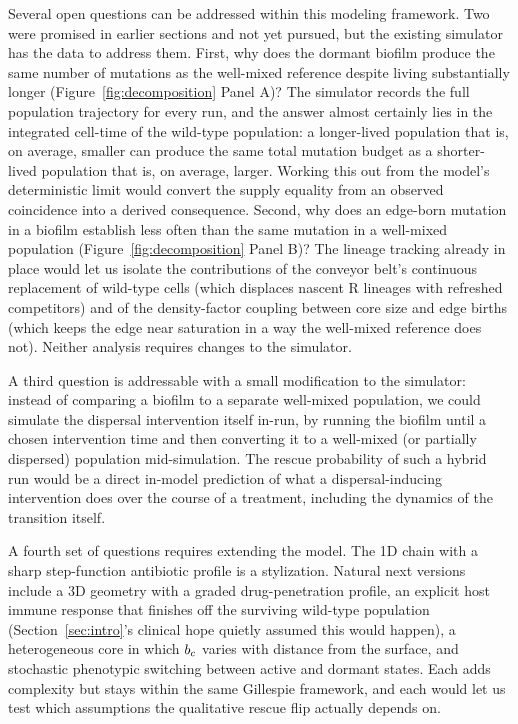 Several open questions can be addressed within this modeling framework. Two were promised in earlier sections and not yet pursued, but the existing simulator has the data to address them. First, why does the dormant biofilm produce the same number of mutations as the well-mixed reference despite living substantially longer (Figure~\ref{fig:decomposition} Panel A)? The simulator records the full population trajectory for every run, and the answer almost certainly lies in the integrated cell-time of the wild-type population: a longer-lived population that is, on average, smaller can produce the same total mutation budget as a shorter-lived population that is, on average, larger. Working this out from the model's deterministic limit would convert the supply equality from an observed coincidence into a derived consequence. Second, why does an edge-born mutation in a biofilm establish less often than the same mutation in a well-mixed population (Figure~\ref{fig:decomposition} Panel B)? The lineage tracking already in place would let us isolate the contributions of the conveyor belt's continuous replacement of wild-type cells (which displaces nascent R lineages with refreshed competitors) and of the density-factor coupling between core size and edge births (which keeps the edge near saturation in a way the well-mixed reference does not). Neither analysis requires changes to the simulator.

A third question is addressable with a small modification to the simulator: instead of comparing a biofilm to a separate well-mixed population, we could simulate the dispersal intervention itself in-run, by running the biofilm until a chosen intervention time and then converting it to a well-mixed (or partially dispersed) population mid-simulation. The rescue probability of such a hybrid run would be a direct in-model prediction of what a dispersal-inducing intervention does over the course of a treatment, including the dynamics of the transition itself.

A fourth set of questions requires extending the model. The 1D chain with a sharp step-function antibiotic profile is a stylization. Natural next versions include a 3D geometry with a graded drug-penetration profile, an explicit host immune response that finishes off the surviving wild-type population (Section~\ref{sec:intro}'s clinical hope quietly assumed this would happen), a heterogeneous core in which $b_c$ varies with distance from the surface, and stochastic phenotypic switching between active and dormant states. Each adds complexity but stays within the same Gillespie framework, and each would let us test which assumptions the qualitative rescue flip actually depends on.


